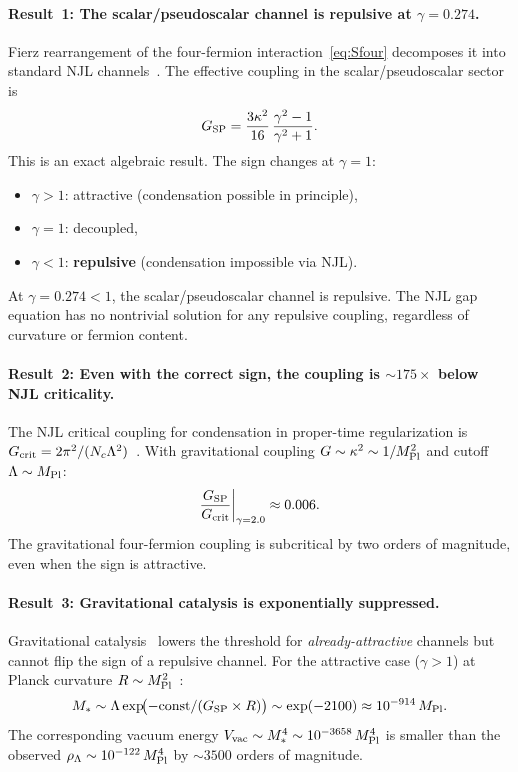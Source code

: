 \documentclass[11pt,letterpaper]{article}
\newcommand{\MPl}{M_{\rm Pl}}
\newcommand{\BI}{\gamma}               %
\newcommand{\Gsp}{G_{\rm SP}}
\newcommand{\Gcrit}{G_{\rm crit}}
\begin{document}
\paragraph{Result~1: The scalar/pseudoscalar channel is repulsive at
$\BI=0.274$.}
Fierz rearrangement of the four-fermion interaction~\eqref{eq:Sfour}
decomposes it into standard NJL channels~\cite{comp2,comp2b}. The effective
coupling in the scalar/pseudoscalar sector is
\begin{equation}\label{eq:GSP}
  \Gsp = \frac{3\kappa^2}{16}\,\frac{\BI^2-1}{\BI^2+1}.
\end{equation}
This is an exact algebraic result. The sign changes at $\BI=1$:
\begin{itemize}
  \item $\BI>1$: attractive (condensation possible in principle),
  \item $\BI=1$: decoupled,
  \item $\BI<1$: \textbf{repulsive} (condensation impossible via NJL).
\end{itemize}
At $\BI=0.274<1$, the scalar/pseudoscalar channel is repulsive. The NJL gap
equation has no nontrivial solution for any repulsive coupling, regardless of
curvature or fermion content.

\paragraph{Result~2: Even with the correct sign, the coupling is
${\sim}175\times$ below NJL criticality.}
The NJL critical coupling for condensation in proper-time regularization is
$\Gcrit = 2\pi^2/(N_c\Lambda^2)$~\cite{comp3b}. With gravitational coupling
$G\sim\kappa^2\sim 1/\MPl^2$ and cutoff $\Lambda\sim\MPl$:
\begin{equation}\label{eq:ratio}
  \frac{\Gsp}{\Gcrit}\bigg|_{\BI=2.0}\approx 0.006.
\end{equation}
The gravitational four-fermion coupling is subcritical by two orders of
magnitude, even when the sign is attractive.

\paragraph{Result~3: Gravitational catalysis is exponentially suppressed.}
Gravitational catalysis~\cite{GorbarGusynin2008} lowers the threshold for
\emph{already-attractive} channels but cannot flip the sign of a repulsive
channel. For the attractive case ($\BI>1$) at Planck curvature
$R\sim\MPl^2$~\cite{comp3b}:
\begin{equation}\label{eq:catalysis}
  M_*\sim\Lambda\exp\!\bigl(-\text{const}/(G_{\rm SP}\times R)\bigr)
  \sim\exp(-2100)\approx 10^{-914}\,\MPl.
\end{equation}
The corresponding vacuum energy $V_{\rm vac}\sim M_*^4\sim 10^{-3658}\,\MPl^4$
is smaller than the observed $\rho_\Lambda\sim 10^{-122}\,\MPl^4$ by
${\sim}3500$ orders of magnitude.
\end{document}
